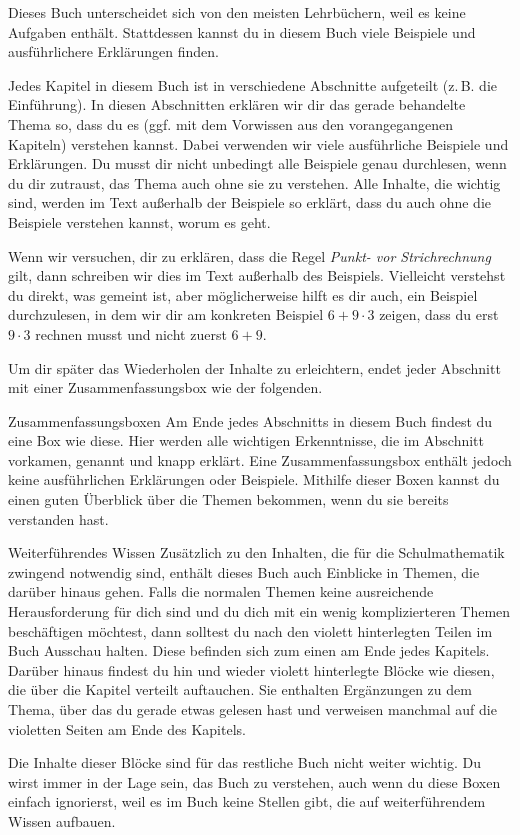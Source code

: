 \documentclass[../main.tex]{subfiles}
\begin{document}
Dieses Buch unterscheidet sich von den meisten Lehrbüchern, weil es keine Aufgaben enthält. Stattdessen kannst du in diesem Buch viele Beispiele und ausführlichere Erklärungen finden.

Jedes Kapitel in diesem Buch ist in verschiedene Abschnitte aufgeteilt (z.\,B. die Einführung). In diesen Abschnitten erklären wir dir das gerade behandelte Thema so, dass du es (ggf. mit dem Vorwissen aus den vorangegangenen Kapiteln) verstehen kannst. Dabei verwenden wir viele ausführliche Beispiele und Erklärungen. Du musst dir nicht unbedingt alle Beispiele genau durchlesen, wenn du dir zutraust, das Thema auch ohne sie zu verstehen. Alle Inhalte, die wichtig sind, werden im Text außerhalb der Beispiele so erklärt, dass du auch ohne die Beispiele verstehen kannst, worum es geht. 

\begin{example}{}
    Wenn wir versuchen, dir zu erklären, dass die Regel \emph{Punkt- vor Strichrechnung} gilt, dann schreiben wir dies im Text außerhalb des Beispiels. Vielleicht verstehst du direkt, was gemeint ist, aber möglicherweise hilft es dir auch, ein Beispiel durchzulesen, in dem wir dir am konkreten Beispiel $6+9\cdot 3$ zeigen, dass du erst $9\cdot 3$ rechnen musst und nicht zuerst $6+9$.
\end{example}

Um dir später das Wiederholen der Inhalte zu erleichtern, endet jeder Abschnitt mit einer Zusammenfassungsbox wie der folgenden.

\begin{nutshell}{Zusammenfassungsboxen}
    Am Ende jedes Abschnitts in diesem Buch findest du eine Box wie diese. Hier werden alle wichtigen Erkenntnisse, die im Abschnitt vorkamen, genannt und knapp erklärt. Eine Zusammenfassungsbox enthält jedoch keine ausführlichen Erklärungen oder Beispiele. Mithilfe dieser Boxen kannst du einen guten Überblick über die Themen bekommen, wenn du sie bereits verstanden hast.
\end{nutshell}

\begin{advanced}{Weiterführendes Wissen}
    Zusätzlich zu den Inhalten, die für die Schulmathematik zwingend notwendig sind, enthält dieses Buch auch Einblicke in Themen, die darüber hinaus gehen. Falls die normalen Themen keine ausreichende Herausforderung für dich sind und du dich mit ein wenig komplizierteren Themen beschäftigen möchtest, dann solltest du nach den violett hinterlegten Teilen im Buch Ausschau halten. Diese befinden sich zum einen am Ende jedes Kapitels. Darüber hinaus findest du hin und wieder violett hinterlegte Blöcke wie diesen, die über die Kapitel verteilt auftauchen. Sie enthalten Ergänzungen zu dem Thema, über das du gerade etwas gelesen hast und verweisen manchmal auf die violetten Seiten am Ende des Kapitels.

    Die Inhalte dieser Blöcke sind für das restliche Buch nicht weiter wichtig. Du wirst immer in der Lage sein, das Buch zu verstehen, auch wenn du diese Boxen einfach ignorierst, weil es im Buch keine Stellen gibt, die auf weiterführendem Wissen aufbauen.
\end{advanced}
\end{document}
